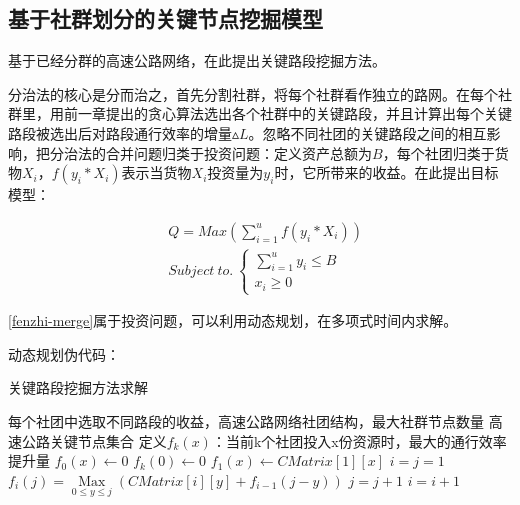 		\subsection{基于社群划分的关键节点挖掘模型}
				基于已经分群的高速公路网络，在此提出关键路段挖掘方法。

				分治法的核心是分而治之，首先分割社群，将每个社群看作独立的路网。在每个社群里，用前一章提出的贪心算法选出各个社群中的关键路段，并且计算出每个关键路段被选出后对路段通行效率的增量$\vartriangle L$。忽略不同社团的关键路段之间的相互影响，把分治法的合并问题归类于投资问题：定义资产总额为$B$，每个社团归类于货物$X_i$，$f(y_i*X_{i})$表示当货物$X_i$投资量为$y_i$时，它所带来的收益。在此提出目标模型：

				\begin{align}
				 &Q=Max(\sum\limits_{i = 1}^u {f({y_i}*{X_i})})   \label{fenzhi-merge} \\
				 &Subject \  to. \  \left\{ {\begin{array}{*{20}{c}}
					  {\sum\limits_{i = 1}^u {{y_i}}  \leqslant B} \\ 
					  {{x_i} \geqslant 0} 
				\end{array}} \right.
				\end{align}

				\ref{fenzhi-merge}属于投资问题，可以利用动态规划，在多项式时间内求解。

				动态规划伪代码：

				\begin{algorithm}[h]
		        \caption{关键路段挖掘方法求解}  
		        \label{touzi}
		        \begin{algorithmic}[1] %
		            \Require 每个社团中选取不同路段的收益，高速公路网络社团结构，最大社群节点数量
		            \Ensure 高速公路关键节点集合
		                \State 定义$f_k (x)$：当前k个社团投入x份资源时，最大的通行效率提升量
		                \State $f_0 (x)\gets 0$
		                \State $f_k (0)\gets 0$
		                \State $f_1 (x)\gets CMatrix[1][x]$
		                \State $i=j=1$
		                		\State $f_i (j)=\mathop {{\text{Max}}}\limits_{0 \leqslant y \leqslant j} (CMatrix[i][y]+f_{i-1} (j-y))$
		                		\State $j=j+1$
		                	\EndWhile
		                	\State $i=i+1$
		                \EndWhile  
		                \State {}  
		            \EndFunction  
		        \end{algorithmic}  
		    	\end{algorithm} 


